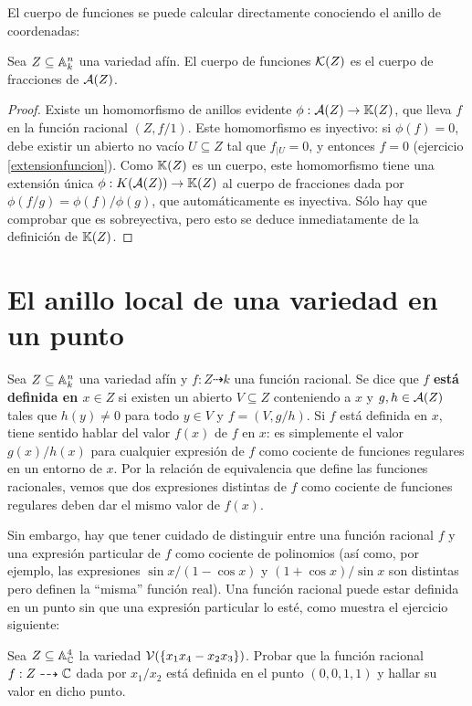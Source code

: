 \documentclass[ACGA.tex]{subfiles}
\begin{document}
El cuerpo de funciones se puede calcular directamente conociendo el anillo de coordenadas:

\begin{prop}
 Sea $Z\subseteq \mathbb{A}^n_k$ una variedad afín. El cuerpo de funciones ${\mathcal K}(Z)$ es el cuerpo de fracciones de ${\mathcal A}(Z)$.
\end{prop}

\begin{proof}
 Existe un homomorfismo de anillos evidente $\phi:{\mathcal A}(Z)\to\mathbb{K}(Z)$, que lleva $f$ en la función racional $(Z,f/1)$. Este homomorfismo es inyectivo: si $\phi(f)=0$, debe existir un abierto no vacío $U\subseteq Z$ tal que $f_{|U}=0$, y entonces $f=0$ (ejercicio \ref{extensionfuncion}). Como $\mathbb{K}(Z)$ es un cuerpo, este homomorfismo tiene una extensión única $\phi:K({\mathcal A}(Z))\to\mathbb{K}(Z)$ al cuerpo de fracciones dada por $\phi(f/g)=\phi(f)/\phi(g)$, que automáticamente es inyectiva. Sólo hay que comprobar que es sobreyectiva, pero esto se deduce inmediatamente de la definición de $\mathbb{K}(Z)$.
\end{proof}


\section{El anillo local de una variedad en un punto}

Sea $Z\subseteq\mathbb{A}^n_k$ una variedad afín y $f:Z\dashrightarrow k$ una función racional. Se dice que $f$ {\bf está definida en $x\in Z$} si existen un abierto $V\subseteq Z$ conteniendo a $x$ y $g,h\in {\mathcal A}(Z)$ tales que $h(y)\neq 0$ para todo $y\in V$ y $f=(V,g/h)$. Si $f$ está definida en $x$, tiene sentido hablar del valor $f(x)$ de $f$ en $x$: es simplemente el valor $g(x)/h(x)$ para cualquier expresión de $f$ como cociente de funciones regulares en un entorno de $x$. Por la relación de equivalencia que define las funciones racionales, vemos que dos expresiones distintas de $f$ como cociente de funciones regulares deben dar el mismo valor de $f(x)$.

Sin embargo, hay que tener cuidado de distinguir entre una función racional $f$ y una expresión particular de $f$ como cociente de polinomios (así como, por ejemplo, las expresiones $\sin x /(1-\cos x)$ y $(1+\cos x)/\sin x$ son distintas pero definen la ``misma'' función real). Una función racional puede estar definida en un punto sin que una expresión particular lo esté, como muestra el ejercicio siguiente:

\begin{ejer}
 Sea $Z\subseteq \mathbb{A}^4_{\mathbb{C}}$ la variedad $\mathcal{V}(\{x_1x_4-x_2x_3\})$. Probar que la función racional $f:Z\dashrightarrow \mathbb{C}$ dada por $x_1/x_2$ está definida en el punto $(0,0,1,1)$ y hallar su valor en dicho punto.
\end{ejer}
\end{document}
